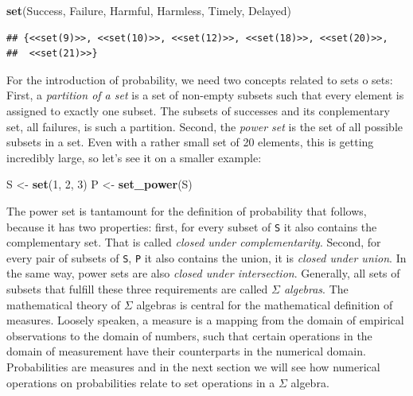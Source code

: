 \documentclass[]{svmono}
\newenvironment{Shaded}{\begin{snugshade}}{\end{snugshade}}
\newcommand{\KeywordTok}[1]{\textcolor[rgb]{0.13,0.29,0.53}{\textbf{#1}}}
\newcommand{\DecValTok}[1]{\textcolor[rgb]{0.00,0.00,0.81}{#1}}
\newcommand{\StringTok}[1]{\textcolor[rgb]{0.31,0.60,0.02}{#1}}
\newcommand{\NormalTok}[1]{#1}
\theoremstyle{definition}
\theoremstyle{definition}
\theoremstyle{definition}
\theoremstyle{remark}
\begin{document}
\begin{Shaded}
\begin{Highlighting}[]
\KeywordTok{set}\NormalTok{(Success, Failure, Harmful, Harmless, Timely, Delayed)}
\end{Highlighting}
\end{Shaded}

\begin{verbatim}
## {<<set(9)>>, <<set(10)>>, <<set(12)>>, <<set(18)>>, <<set(20)>>,
##  <<set(21)>>}
\end{verbatim}

For the introduction of probability, we need two concepts related to
sets o sets: First, a \emph{partition of a set} is a set of non-empty
subsets such that every element is assigned to exactly one subset. The
subsets of successes and its conplementary set, all failures, is such a
partition. Second, the \emph{power set} is the set of all possible
subsets in a set. Even with a rather small set of 20 elements, this is
getting incredibly large, so let's see it on a smaller example:

\begin{Shaded}
\begin{Highlighting}[]
\NormalTok{S <-}\StringTok{ }\KeywordTok{set}\NormalTok{(}\DecValTok{1}\NormalTok{, }\DecValTok{2}\NormalTok{, }\DecValTok{3}\NormalTok{)}
\NormalTok{P <-}\StringTok{ }\KeywordTok{set_power}\NormalTok{(S)}
\end{Highlighting}
\end{Shaded}

The power set is tantamount for the definition of probability that
follows, because it has two properties: first, for every subset of
\texttt{S} it also contains the complementary set. That is called
\emph{closed under complementarity}. Second, for every pair of subsets
of \texttt{S}, \texttt{P} it also contains the union, it is \emph{closed
under union}. In the same way, power sets are also \emph{closed under
intersection}. Generally, all sets of subsets that fulfill these three
requirements are called \emph{\(\Sigma\) algebras}. The mathematical
theory of \(\Sigma\) algebras is central for the mathematical definition
of measures. Loosely speaken, a measure is a mapping from the domain of
empirical observations to the domain of numbers, such that certain
operations in the domain of measurement have their counterparts in the
numerical domain. Probabilities are measures and in the next section we
will see how numerical operations on probabilities relate to set
operations in a \(\Sigma\) algebra.
\end{document}
